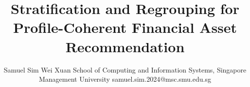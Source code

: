 \title{Stratification and Regrouping for Profile-Coherent Financial Asset Recommendation}

\author{
    Samuel Sim Wei Xuan
    \affiliations
    School of Computing and Information Systems, Singapore Management University
    \emails
    samuel.sim.2024@msc.smu.edu.sg
}
